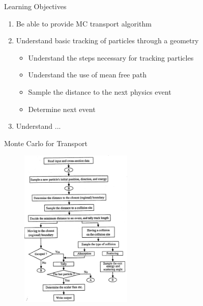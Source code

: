 \documentclass[xcolor=x11names,compress]{beamer}
\renewcommand{\(}{\begin{columns}}
\renewcommand{\)}{\end{columns}}
\newcommand{\<}[1]{\begin{column}{#1}}
\renewcommand{\>}{\end{column}}
\begin{document}
\begin{frame}{Learning Objectives}

    \begin{enumerate}
    \item Be able to provide MC transport algorithm
    \item Understand basic tracking of particles through a geometry
      \begin{itemize}
      \item Understand the steps necessary for tracking particles
      \item Understand the use of mean free path
      \item Sample the distance to the next physics event
      \item Determine next event
      \end{itemize}
    \item Understand ...
    \end{enumerate}

\end{frame}


\begin{frame}{Monte Carlo for Transport}

  	\begin{figure}
  	\begin{center}
  		\includegraphics[height=3in,clip]{MC-algorithm}
	\end{center}
  	\end{figure}
  	
\end{frame}
\end{document}

